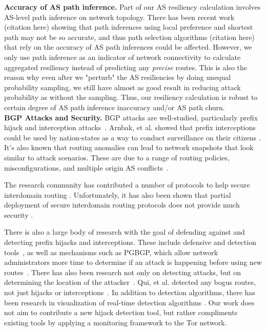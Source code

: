 {\bf Accuracy of AS path inference.}  
Part of our AS resiliency calculation involves AS-level path inference on network topology. There has been recent work (citation here) showing that path inferences using local preference and shortest path may not be so accurate, and thus path selection algorithms (citation here) that rely on the accuracy of AS path inferences could be affected. However, we only use path inference as an indicator of network connectivity to calculate aggregated resiliency instead of predicting any \emph{precise} routes. This is also the reason why even after we "perturb" the AS resiliencies by doing unequal probability sampling, we still have almost as good result in reducing attack probability as without the sampling. Thus, our resiliency calculation is robust to certain degree of AS path inference inaccuracy and/or AS path churn. 
\\
{\bf BGP Attacks and Security.}
BGP attacks are well-studied, particularly prefix hijack and interception attacks~\cite{ballani2007study, mcarthur2009stealthy, zhang2012studying}.  Arnbak, et al. showed that prefix interceptions could be used by nation-states as a way to conduct surveillance on their citizens \cite{arnbak2014loopholes}.  It's also known that routing anomalies can lead to network snapshots that look similar to attack scenarios.  These are due to a range of routing policies, misconfigurations, and multiple origin AS conflicts~\cite{caesar2005bgp, mahajan2002understanding, zhao2001analysis}.  

The research community has contributed a number of protocols to help secure interdomain routing \cite{boldyreva2012provable, chan2006modeling, gill2011let, hu2004spv, zhang2009hc, van2007interdomain}.  Unfortunately, it has also been shown that partial deployment of secure interdomain routing protocols does not provide much security \cite{lychev2013bgp}.

There is also a large body of research with the goal of defending against and detecting prefix hijacks and interceptions.  These include defensive and detection tools~\cite{lad2006phas, hu2007accurate, shi2012detecting, zhang2008ispy, zheng2007light, sriram2009comparative, zhang2007practical}, as well as mechanisms such as PGBGP, which allow network administrators more time to determine if an attack is happening before using new routes~\cite{karlin2006pretty}.  There has also been research not only on detecting attacks, but on determining the location of the attacker~\cite{qiu2009locating}.  Qui, et al. detected any bogus routes, not just hijacks or interceptions~\cite{qiu2007detecting}.  In addition to detection algorithms, there has been research in visualization of real-time detection algorithms \cite{teoh2006bgp}.  Our work does not aim to contribute a new hijack detection tool, but rather compliments existing tools by applying a monitoring framework to the Tor network. 



